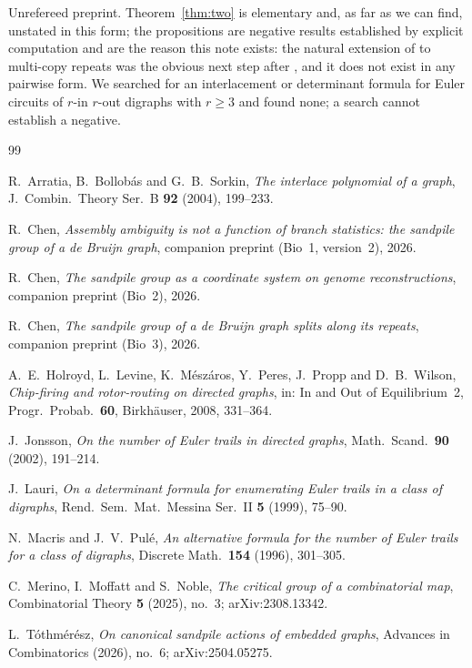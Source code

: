\documentclass[11pt]{article}
\theoremstyle{plain}
\theoremstyle{definition}
\theoremstyle{remark}
\begin{document}
Unrefereed preprint. Theorem~\ref{thm:two} is elementary and, as far as we can find,
unstated in this form; the propositions are negative results established by explicit
computation and are the reason this note exists: the natural extension of \cite{MMN} to
multi-copy repeats was the obvious next step after \cite{Bio3}, and it does not exist in
any pairwise form. We searched for an interlacement or determinant formula for Euler
circuits of $r$-in $r$-out digraphs with $r\ge3$ and found none; a search cannot
establish a negative.

\begin{thebibliography}{99}

 R.~Arratia, B.~Bollob\'as and G.~B.~Sorkin,
\emph{The interlace polynomial of a graph},
J.\ Combin.\ Theory Ser.~B \textbf{92} (2004), 199--233.

 R.~Chen,
\emph{Assembly ambiguity is not a function of branch statistics: the sandpile group of a
de Bruijn graph}, companion preprint (Bio~1, version~2), 2026.

 R.~Chen,
\emph{The sandpile group as a coordinate system on genome reconstructions}, companion
preprint (Bio~2), 2026.

 R.~Chen,
\emph{The sandpile group of a de Bruijn graph splits along its repeats}, companion
preprint (Bio~3), 2026.

 A.~E.~Holroyd, L.~Levine, K.~M\'esz\'aros, Y.~Peres, J.~Propp and
D.~B.~Wilson, \emph{Chip-firing and rotor-routing on directed graphs}, in: In and Out of
Equilibrium~2, Progr.\ Probab.\ \textbf{60}, Birkh\"auser, 2008, 331--364.

 J.~Jonsson,
\emph{On the number of Euler trails in directed graphs},
Math.\ Scand.\ \textbf{90} (2002), 191--214.

 J.~Lauri,
\emph{On a determinant formula for enumerating Euler trails in a class of digraphs},
Rend.\ Sem.\ Mat.\ Messina Ser.~II \textbf{5} (1999), 75--90.

 N.~Macris and J.~V.~Pul\'e,
\emph{An alternative formula for the number of Euler trails for a class of digraphs},
Discrete Math.\ \textbf{154} (1996), 301--305.

 C.~Merino, I.~Moffatt and S.~Noble,
\emph{The critical group of a combinatorial map},
Combinatorial Theory \textbf{5} (2025), no.~3; arXiv:2308.13342.

 L.~T\'othm\'er\'esz,
\emph{On canonical sandpile actions of embedded graphs},
Advances in Combinatorics (2026), no.~6; arXiv:2504.05275.

\end{thebibliography}
\end{document}
